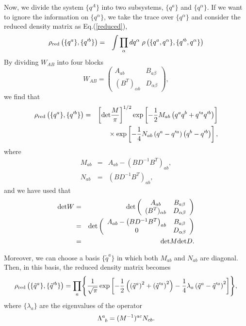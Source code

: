 Now, we divide the system $\{q^A\}$
into two subsystems, $\{q^a\}$ and $\{q^\alpha\}$.
If we want to ignore the information on $\{q^\alpha\}$,
we take the trace over $\{q^\alpha\}$ and consider
the reduced density matrix as Eq.(\ref{reduced}),
\begin{eqnarray}
 \rho_{{\rm red}}\left(\{q^a\},\{q'^b\}\right)
  &=& \int \prod_\alpha dq^\alpha
        \;\rho\left(\{q^a,q^\alpha\},\{q'^b,q^\alpha\}\right)
\end{eqnarray}
By dividing $W_{AB}$ into four blocks
\begin{equation}
W_{AB}=\left(\begin{array}{cc}
 A_{ab} & B_{a\beta} \\
 (B^T)_{\alpha b} & D_{\alpha\beta}
\end{array}\right),
\end{equation}
we find that
\begin{eqnarray}
 \rho_{{\rm red}}\left(\{q^a\},\{q'^b\}\right)
  &=& \left[{\rm det}\frac{M}{\pi}\right]^{1/2}
        \exp\left[-\frac{1}{2}M_{ab}
       \left(q^aq^b+q'^aq'^b\right) \right] \nonumber \\
  & &  {}\times \exp\left[-\frac{1}{4}N_{ab}
        \left(q^a-q'^a\right)\left(q^b-q'^b\right)\right],
\end{eqnarray}
where
\begin{eqnarray}
  M_{ab} &=& A_{ab}-\left(BD^{-1}B^T\right)_{ab}, \\
  N_{ab} &=& \left(BD^{-1}B^T\right)_{ab},
\end{eqnarray}
and we have used that
\begin{eqnarray*}
 {\rm det}W &=& {\rm det}\left(\begin{array}{cc}
 A_{ab} & B_{a\beta} \\
 (B^T)_{\alpha b} & D_{\alpha\beta}
\end{array}\right)   \\
  &=& {\rm det}\left(\begin{array}{cc}
 A_{ab}-\left(BD^{-1}B^T\right)_{ab} & B_{a\beta} \\
 0 & D_{\alpha\beta}
\end{array}\right)  \\
 &=& {\rm det}M{\rm det}D.
\end{eqnarray*}

Moreover, we can choose a basis $\{\tilde{q}^a\}$
in which both $M_{ab}$ and $N_{ab}$ are diagonal.
Then, in this basis, the reduced density matrix
becomes
\begin{equation}
 \rho_{{\rm red}}\left(\{\tilde{q}^a\},\{\tilde{q}'^b\}\right)
  = \prod_a\Biggl\{ \frac{1}{\sqrt{\pi}}
        \exp\left[-\frac{1}{2}
       \left(\left(\tilde{q}^a\right)^2+\left(\tilde{q}'^a\right)^2
        \right)-\frac{1}{4}\lambda_a
        \left(\tilde{q}^a-\tilde{q}'^a\right)^2
        \right]\Biggr\},
\end{equation}
where $\{\lambda_a\}$ are the eigenvalues of the operator
\begin{equation}
  \Lambda^a_{\sp b}=(M^{-1})^{ac}N_{cb}.
\label{defL1}
\end{equation}

